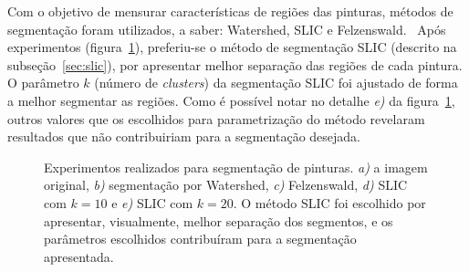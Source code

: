 Com o objetivo de mensurar características de regiões das pinturas,
métodos de segmentação foram utilizados, a saber: Watershed, SLIC e
Felzenswald.~\cite{gonzalez,luciano} Após experimentos
(figura~\ref{fig:expsegs}), preferiu-se o método de segmentação SLIC
(descrito na subseção~\ref{sec:slic}), por apresentar melhor separação
das regiões de cada pintura. O parâmetro $k$ (número
de \textit{clusters}) da segmentação SLIC foi ajustado de forma a
melhor segmentar as regiões. Como é possível notar no
detalhe \textit{e)} da figura~\ref{fig:expsegs}, outros valores que os
escolhidos para parametrização do método revelaram resultados que não
contribuiriam para a segmentação desejada.

\begin{figure}[h!]
\begin{center}
         \caption{Experimentos realizados para segmentação de pinturas. \textit{a)}
        a imagem original, \textit{b)} segmentação por Watershed, \textit{c)}
        Felzenswald, \textit{d)} SLIC com $k=10$ e \textit{e)} SLIC com
        $k=20$. O método SLIC foi escolhido por apresentar, visualmente,
        melhor separação dos segmentos, e os parâmetros escolhidos contribuíram
        para a segmentação apresentada.}
        \label{fig:expsegs}

\end{center}
\end{figure}
